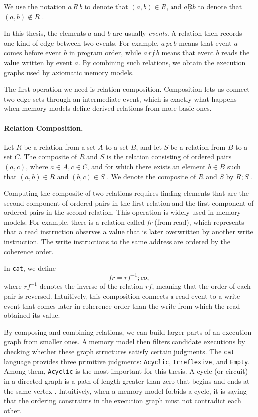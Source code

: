 We use the notation \(a \, R \, b\) to denote that \((a,b) \in R\), and \(a \not R b\) to denote that \((a,b) \notin R\) \citep[p.~600]{rosen2012discrete}.

In this thesis, the elements \(a\) and \(b\) are usually \emph{events}. A relation then records one kind of edge between two events. For example, $a \,\mathit{po}\, b$ means that event $a$ comes before event $b$ in program order, while $a \,\mathit{rf}\, b$ means that event $b$ reads the value written by event $a$. By combining such relations, we obtain the execution graphs used by axiomatic memory models.

The first operation we need is relation composition. Composition lets us connect two edge sets through an intermediate event, which is exactly what happens when memory models define derived relations from more basic ones.

\paragraph{Relation Composition.}
Let $R$ be a relation from a set $A$ to a set $B$, and let $S$ be a relation from $B$ to a set $C$. The composite of $R$ and $S$ is the relation consisting of ordered pairs $(a, c)$, where $a \in A, c \in C$, and for which there exists an element $b \in B$ such that $(a, b) \in R$ and $(b, c) \in S$ \citep[p.~607]{rosen2012discrete}. We denote the composite of $R$ and $S$ by $R ; S$ \citep[p.~607]{rosen2012discrete}.

Computing the composite of two relations requires finding elements that are the second component of ordered pairs in the first relation and the first component of ordered pairs in the second relation. This operation is widely used in memory models. For example, there is a relation called \emph{fr} (from-read), which represents that a read instruction observes a value that is later overwritten by another write instruction. The write instructions to the same address are ordered by the coherence order.

In \texttt{cat}, we define
\[
fr = rf^{-1} ; co,
\]
where \(rf^{-1}\) denotes the inverse of the relation \(rf\), meaning that the order of each pair is reversed. Intuitively, this composition connects a read event to a write event that comes later in coherence order than the write from which the read obtained its value.

By composing and combining relations, we can build larger parts of an execution graph from smaller ones. A memory model then filters candidate executions by checking whether these graph structures satisfy certain judgments. The \texttt{cat} language provides three primitive judgments: \texttt{Acyclic}, \texttt{Irreflexive}, and \texttt{Empty}. Among them, \texttt{Acyclic} is the most important for this thesis. A cycle (or circuit) in a directed graph is a path of length greater than zero that begins and ends at the same vertex \cite[pp.~665,~715]{rosen2012discrete}. Intuitively, when a memory model forbids a cycle, it is saying that the ordering constraints in the execution graph must not contradict each other.

